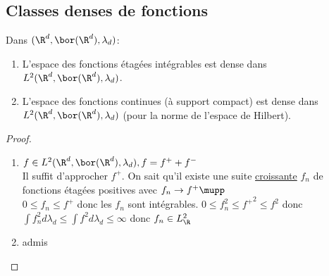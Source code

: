 \subsection{Classes denses de fonctions}

\begin{theorem}
	Dans $(\R^d, \bor (\R^d), \lambda_d)$:

	\begin{enumerate}
		\item L'espace des fonctions étagées intégrables est dense dans $L^2(\R^d, \bor (\R^d), \lambda_d)$.
		\item L'espace des fonctions continues (à support compact) est dense dans $L^2(\R^d, \bor (\R^d), \lambda_d)$ (pour la norme de l'espace de Hilbert).
	\end{enumerate}
\end{theorem}

\begin{proof}
	\begin{enumerate}
		\item $ f \in L^2(\R^d, \bor (\R^d), \lambda_d), f = f^+ + f^-$\\
		      Il suffit d'approcher $f^+$. On sait qu'il existe une suite \underline{croissante} $f_n$ de fonctions étagées positives avec $f_n \to f^+ \mupp$ \\
		      $0 \leq f_n \leq f^+$ donc les $f_n$ sont intégrables.
		      $0\leq f_n^2 \leq {f^+}^2 \leq f^2$ donc $\int f_n^2 d \lambda_d \leq \int f^2d \lambda_d \le \infty$ donc $f_n \in L^2_\R$
		\item admis
	\end{enumerate}
\end{proof}



